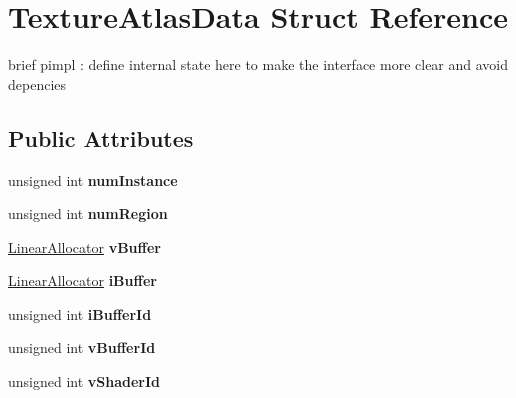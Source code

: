 \hypertarget{struct_texture_atlas_data}{\section{Texture\-Atlas\-Data Struct Reference}
\label{struct_texture_atlas_data}
}


brief pimpl \-: define internal state here to make the interface more clear and avoid depencies  


\subsection*{Public Attributes}
\begin{DoxyCompactItemize}
\item 
\hypertarget{struct_texture_atlas_data_af9945277a693c03e09fbb25d4f832575}{unsigned int {\bfseries num\-Instance}}\label{struct_texture_atlas_data_af9945277a693c03e09fbb25d4f832575}

\item 
\hypertarget{struct_texture_atlas_data_a698b1201494e4594c1e61d8eaa89c7bf}{unsigned int {\bfseries num\-Region}}\label{struct_texture_atlas_data_a698b1201494e4594c1e61d8eaa89c7bf}

\item 
\hypertarget{struct_texture_atlas_data_abceb90af2ece1bd3f50b68fcecce7a52}{\hyperlink{class_linear_allocator}{Linear\-Allocator} {\bfseries v\-Buffer}}\label{struct_texture_atlas_data_abceb90af2ece1bd3f50b68fcecce7a52}

\item 
\hypertarget{struct_texture_atlas_data_aecd18978b18c6b35f6a3ce7dd0ade997}{\hyperlink{class_linear_allocator}{Linear\-Allocator} {\bfseries i\-Buffer}}\label{struct_texture_atlas_data_aecd18978b18c6b35f6a3ce7dd0ade997}

\item 
\hypertarget{struct_texture_atlas_data_a0eb0a7570f865e168395124b953cfcb0}{unsigned int {\bfseries i\-Buffer\-Id}}\label{struct_texture_atlas_data_a0eb0a7570f865e168395124b953cfcb0}

\item 
\hypertarget{struct_texture_atlas_data_afa1ad1ba165e54a8ab31e0f41d288556}{unsigned int {\bfseries v\-Buffer\-Id}}\label{struct_texture_atlas_data_afa1ad1ba165e54a8ab31e0f41d288556}

\item 
\hypertarget{struct_texture_atlas_data_a0c4f8afb74523c3224d44ffe658e2137}{unsigned int {\bfseries v\-Shader\-Id}}\label{struct_texture_atlas_data_a0c4f8afb74523c3224d44ffe658e2137}


\end{DoxyCompactItemize}
